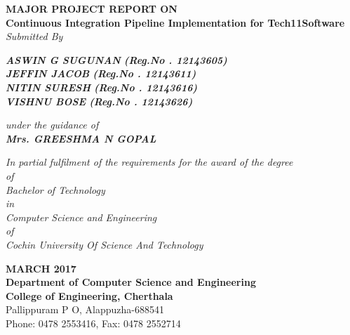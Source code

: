 \documentclass[12pt,a4paper,oneside]{report}
\begin{document}
\begin{titlepage}
\begin{center}

\large{\textbf{MAJOR PROJECT REPORT ON}}\\

\LARGE{\textbf{Continuous Integration Pipeline Implementation for Tech11Software}}\\

\Large{\textit{Submitted By }}\\
\begin{singlespace}
\Large{\textit{\textbf{ASWIN G SUGUNAN }\textbf{(Reg.No . 12143605)}}} \\
\Large{\textit{\textbf{JEFFIN JACOB  }\textbf{(Reg.No . 12143611)}}} \\
\Large{\textit{\textbf{NITIN SURESH }\textbf{(Reg.No . 12143616)}}} \\
\Large{\textit{\textbf{VISHNU BOSE }\textbf{(Reg.No . 12143626)}}} \\

\end{singlespace}
\Large{\textit{\textit{under the guidance of}}}\\
\Large{\textit{\textbf{Mrs. GREESHMA N GOPAL}}}\\
\begin{singlespace}
\small{\textit{In partial fulfilment of the requirements for the award of the degree}\\
\small{ \textit{of}}\\
\small{\textit{Bachelor of Technology} }\\
\small{\textit{in}}\\
\small{\textit{Computer Science and Engineering}}\\
\small{\textit{of}}\\
\small{\textit{Cochin University Of Science And Technology}}}\\
\end{singlespace}
\begin{singlespace}
\begin{figure}[h]
\begin{center}
\end{center}
\end{figure}
\end{singlespace}
\begin{singlespace}

\Large{{\textbf{MARCH 2017\\Department of Computer Science and Engineering\\College of Engineering, Cherthala}\\
Pallippuram P O, Alappuzha-688541 \\Phone: 0478 2553416, Fax: 0478 2552714}}
\end{singlespace}
\end{center}
\end{titlepage}
\end{document}
